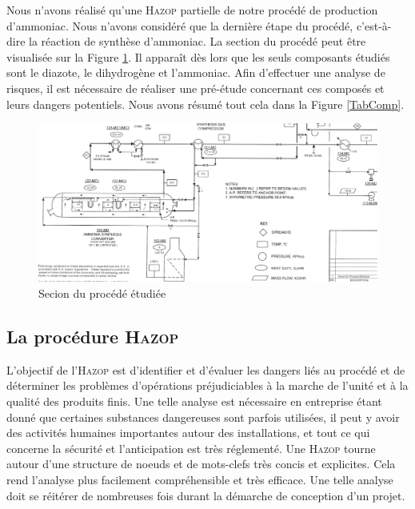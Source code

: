 \documentclass{article}
\begin{document}
Nous n'avons réalisé qu'une \textsc{Hazop} partielle de notre procédé de production d'ammoniac. Nous n'avons considéré que la dernière étape du procédé, c'est-à-dire la réaction de synthèse d'ammoniac. La section du procédé peut être visualisée sur la Figure \ref{section_procede}. Il apparaît dès lors que les seuls composants étudiés sont le diazote, le dihydrogène et l'ammoniac. Afin d'effectuer une analyse de risques, il est nécessaire de réaliser une pré-étude concernant ces composés et leurs dangers potentiels. Nous avons résumé tout cela dans la Figure \ref{TabComp}.\cite{CSST}\cite{Ontario}

\begin{figure}[ht!]
 \centering
 \includegraphics[scale=0.3]{section_procede.PNG}
 \caption{Secion du procédé étudiée}
 \label{section_procede}
\end{figure}

\subsection{La procédure \textsc{Hazop}}

L’objectif de l’\textsc{Hazop} est d’identifier et d’évaluer les dangers liés au procédé et de déterminer les problèmes d’opérations préjudiciables à la marche de l’unité et à la qualité des produits finis. Une telle analyse est nécessaire en entreprise étant donné que certaines substances dangereuses sont parfois utilisées, il peut y avoir des activités humaines importantes autour des installations, et tout ce qui concerne la sécurité et l'anticipation est très réglementé. Une \textsc{Hazop} tourne autour d'une structure de noeuds et de mots-clefs très concis et explicites. Cela rend l'analyse plus facilement compréhensible et très efficace.
Une telle analyse doit se réitérer de nombreuses fois durant la démarche de conception d'un projet.\cite{icamp}
\end{document}
